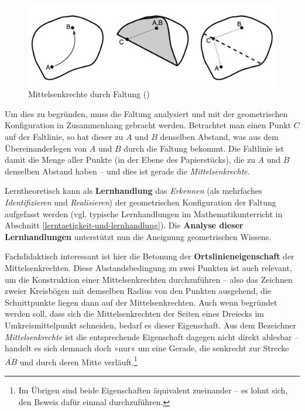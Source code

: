 \documentclass[
]{scrbook}
\theoremstyle{definition}
\theoremstyle{definition}
\theoremstyle{definition}
\theoremstyle{definition}
\theoremstyle{remark}
\begin{document}
\begin{figure}

{\centering \includegraphics[width=0.75\linewidth]{pictures/11-Mittelsenkrechte} 

}

\caption{Mittelsenkrechte durch Faltung ()}\label{fig:Mittelsenkrechte}
\end{figure}

Um dies zu begründen, muss die Faltung analysiert und mit der geometrischen Konfiguration in Zusammenhang gebracht werden. Betrachtet man einen Punkt \(C\) auf der Faltlinie, so hat dieser zu \(A\) und \(B\) denselben Abstand, was aus dem Übereinanderlegen von \(A\) und \(B\) durch die Faltung bekommt. Die Faltlinie ist damit die Menge aller Punkte (in der Ebene des Papierstücks), die zu \(A\) und \(B\) denselben Abstand haben -- und dies ist gerade die \emph{Mittelsenkrechte}.

Lerntheoretisch kann als \textbf{Lernhandlung} das \emph{Erkennen} (als mehrfaches \emph{Identifizieren} und \emph{Realisieren}) der geometrischen Konfiguration der Faltung aufgefasst werden (vgl. typische Lernhandlungen im Mathematikunterricht in Abschnitt \ref{lerntaetigkeit-und-lernhandlung}). Die \textbf{Analyse dieser Lernhandlungen} unterstützt nun die Aneignung geometrischen Wissens.

Fachdidaktisch interessant ist hier die Betonung der \textbf{Ortslinieneigenschaft} der Mittelsenkrechten. Diese Abstandsbedingung zu zwei Punkten ist auch relevant, um die Konstruktion einer Mittelsenkrechten durchzuführen -- also das Zeichnen zweier Kreisbögen mit demselben Radius von den Punkten ausgehend, die Schnittpunkte liegen dann auf der Mittelsenkrechten. Auch wenn begründet werden soll, dass sich die Mittelsenkrechten der Seiten eines Dreiecks im Umkreismittelpunkt schneiden, bedarf es dieser Eigenschaft. Aus dem Bezeichner \emph{Mittelsenkrechte} ist die entsprechende Eigenschaft dagegen nicht direkt ablesbar -- handelt es sich demnach doch »nur« um eine Gerade, die senkrecht zur Strecke \(\overline{AB}\) und durch deren Mitte verläuft.\footnote{Im Übrigen sind beide Eigenschaften äquivalent zueinander -- es lohnt sich, den Beweis dafür einmal durchzuführen.}
\end{document}
